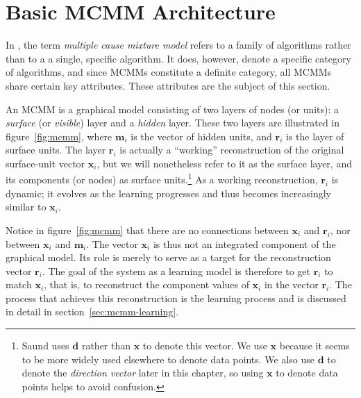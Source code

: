 \section{Basic MCMM Architecture}
\label{sec:architecture}

In \citet{saund:94}, the term \emph{multiple cause mixture model} refers to a family of algorithms rather than to a  a single, 
specific algorithm. It does, however, denote a specific category of algorithms, and since
MCMMs constitute a definite category, 
all MCMMs share certain key attributes.
These attributes are 
the subject of this section. 

An MCMM is a graphical model consisting of two layers of nodes (or units): a \emph{surface} (or \emph{visible}) 
layer and a \emph{hidden} layer.
These two layers are illustrated in figure~\ref{fig:mcmm}, where $\mathbf{m}_i$ 
is the vector of hidden units, and $\mathbf{r}_i$ is the layer of surface units. The layer $\mathbf{r}_i$ is actually a  ``working'' reconstruction of the original surface-unit vector $\mathbf{x}_i$, but we will nonetheless refer to it as the surface layer, and its components (or nodes) as surface units.\footnote{Saund 
uses $\mathbf{d}$ 
rather than $\mathbf{x}$ to denote this vector. We use $\mathbf{x}$ because it seems to be more widely
used elsewhere to denote data points. We also use $\mathbf{d}$ to denote the \emph{direction vector} later in this chapter, so using $\mathbf{x}$ to denote data points helps to avoid confusion.}
As a working
reconstruction, $\mathbf{r}_i$ is dynamic; it evolves as the learning progresses and thus
becomes increasingly similar to $\mathbf{x}_i$. 

Notice in figure~\ref{fig:mcmm} that there are no connections between $\mathbf{x}_i$ and $\mathbf{r}_i$, nor between 
$\mathbf{x}_i$ and $\mathbf{m}_i$. The vector $\mathbf{x}_i$ is thus not an integrated component of the graphical 
model. Its role is merely to serve as a target for the reconstruction vector $\mathbf{r}_i$. 
The goal of the system as a learning model is therefore to get $\mathbf{r}_i$ to 
match $\mathbf{x}_i$, that is, to reconstruct the component values of $\mathbf{x}_i$ in 
the vector $\mathbf{r}_i$. The process that achieves this reconstruction is the learning process and is discussed in detail in section~\ref{sec:mcmm-learning}.

